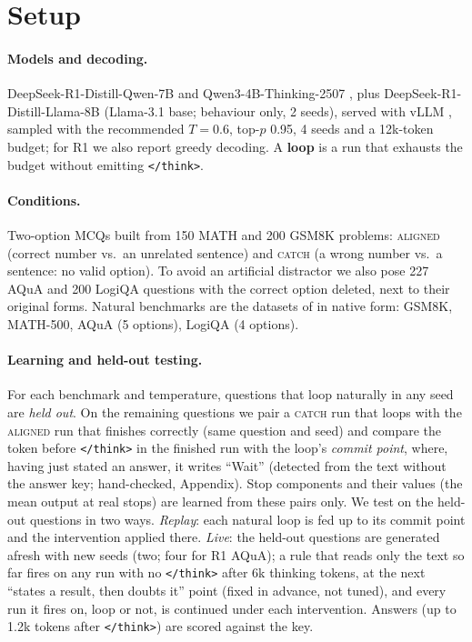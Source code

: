 \documentclass[11pt]{article}
\newcommand{\think}{\texttt{</think>}}
\begin{document}
\section{Setup}
\label{sec:setup}
\paragraph{Models and decoding.} DeepSeek-R1-Distill-Qwen-7B \citep[R1;][]{deepseek2025r1} and
Qwen3-4B-Thinking-2507 \citep{yang2025qwen3}, plus DeepSeek-R1-Distill-Llama-8B \citep{deepseek2025r1} (Llama-3.1 base;
behaviour only, 2 seeds), served with vLLM \citep{kwon2023vllm}, sampled with the
recommended $T{=}0.6$, top-$p$ 0.95, 4 seeds and a 12k-token budget; for R1 we also report greedy
decoding. A \textbf{loop} is a run that exhausts the budget without emitting \think{}.

\paragraph{Conditions.} Two-option MCQs built from 150 MATH \citep{hendrycks2021math} and 200 GSM8K
\citep{cobbe2021gsm8k} problems: \textsc{aligned} (correct number vs.\ an unrelated sentence) and
\textsc{catch} (a wrong number vs.\ a sentence: no valid option). To avoid an artificial distractor we
also pose 227 AQuA \citep{ling2017aqua} and 200 LogiQA \citep{liu2020logiqa} questions with the
correct option deleted, next to their original forms. Natural benchmarks are the datasets of
\citet{yu2026sophia} in native form: GSM8K, MATH-500, AQuA (5 options), LogiQA (4 options).

\paragraph{Learning and held-out testing.} For each benchmark and temperature, questions that loop
naturally in any seed are \emph{held out}. On the remaining questions we pair a \textsc{catch} run that
loops with the \textsc{aligned} run that finishes correctly (same question and seed) and compare the token
before \think{} in the finished run with the loop's \emph{commit point}, where, having just stated an
answer, it writes ``Wait'' (detected from the text without the answer key; hand-checked, Appendix).
Stop components and their values (the mean output at real stops) are learned from these pairs only.
We test on the held-out questions in two ways. \emph{Replay}: each natural loop is fed up to its commit
point and the intervention applied there. \emph{Live}: the held-out questions are generated afresh
with new seeds (two; four for R1 AQuA); a rule that reads only the text so far fires on any run with no \think{} after 6k
thinking tokens, at the next ``states a result, then doubts it'' point (fixed in advance, not tuned),
and every run it fires on, loop or not, is continued under each intervention. Answers (up to 1.2k
tokens after \think{}) are scored against the key.
\end{document}
